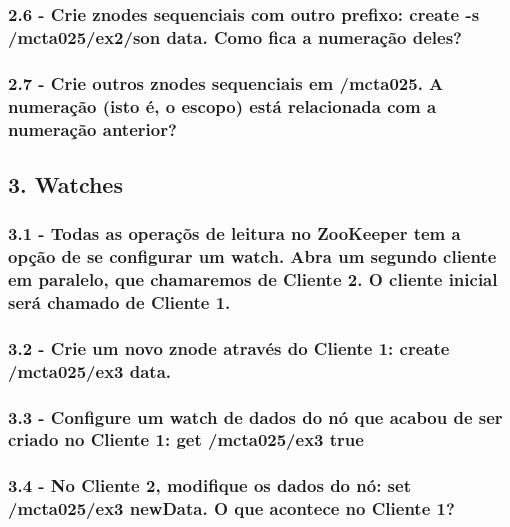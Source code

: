 \subsubsection{2.6 - Crie znodes sequenciais com outro prefixo: create -s
/mcta025/ex2/son data. Como fica a numeração deles?}

\subsubsection{2.7 - Crie outros znodes sequenciais em /mcta025. A numeração (isto é, o escopo) está relacionada com a numeração anterior?}


\subsection*{3. Watches}

\subsubsection{3.1 - Todas as operaçõs de leitura no ZooKeeper tem a opção de se
configurar um watch. Abra um segundo cliente em paralelo, que
chamaremos de Cliente 2. O cliente inicial será chamado de Cliente 1.}

\subsubsection{3.2 - Crie um novo znode através do Cliente 1: create /mcta025/ex3
data.}

\subsubsection{3.3 - Configure um watch de dados do nó que acabou de ser criado no
Cliente 1: get /mcta025/ex3 true}

\subsubsection{3.4 - No Cliente 2, modifique os dados do nó: set /mcta025/ex3
newData. O que acontece no Cliente 1?}

